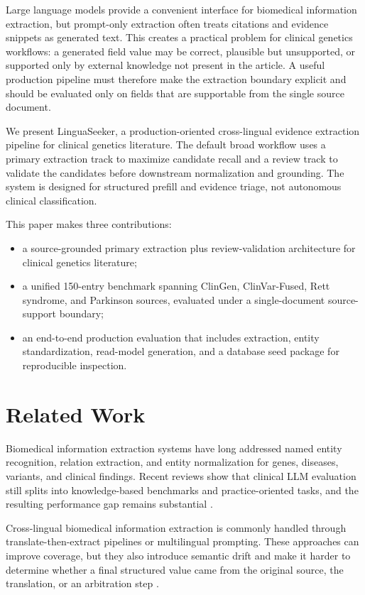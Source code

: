 \documentclass[conference]{IEEEtran}
\newcommand{\methodname}{LinguaSeeker}
\begin{document}
Large language models provide a convenient interface for biomedical information extraction, but prompt-only extraction often treats citations and evidence snippets as generated text. This creates a practical problem for clinical genetics workflows: a generated field value may be correct, plausible but unsupported, or supported only by external knowledge not present in the article. A useful production pipeline must therefore make the extraction boundary explicit and should be evaluated only on fields that are supportable from the single source document.

We present \methodname{}, a production-oriented cross-lingual evidence extraction pipeline for clinical genetics literature. The default broad workflow uses a primary extraction track to maximize candidate recall and a review track to validate the candidates before downstream normalization and grounding. The system is designed for structured prefill and evidence triage, not autonomous clinical classification.

This paper makes three contributions:
\begin{itemize}
  \item a source-grounded primary extraction plus review-validation architecture for clinical genetics literature;
  \item a unified 150-entry benchmark spanning ClinGen, ClinVar-Fused, Rett syndrome, and Parkinson sources, evaluated under a single-document source-support boundary;
  \item an end-to-end production evaluation that includes extraction, entity standardization, read-model generation, and a database seed package for reproducible inspection.
\end{itemize}

\section{Related Work}
Biomedical information extraction systems have long addressed named entity recognition, relation extraction, and entity normalization for genes, diseases, variants, and clinical findings. Recent reviews show that clinical LLM evaluation still splits into knowledge-based benchmarks and practice-oriented tasks, and the resulting performance gap remains substantial \cite{gong2025knowledgepractice,chen2026operationalizing}.

Cross-lingual biomedical information extraction is commonly handled through translate-then-extract pipelines or multilingual prompting. These approaches can improve coverage, but they also introduce semantic drift and make it harder to determine whether a final structured value came from the original source, the translation, or an arbitration step \cite{li2025framefirst,guillen2026mapcare}.
\end{document}
